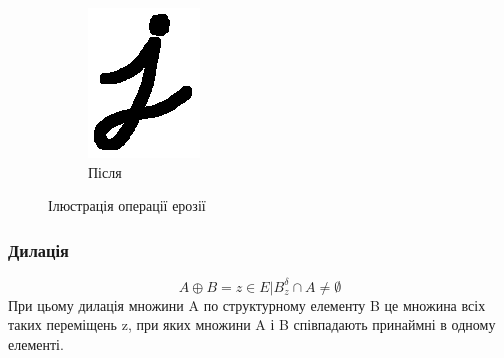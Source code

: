 \begin{figure}[H]
\begin{subfigure}[b]{0.2\textwidth}
			\includegraphics[width=\textwidth]{theory/img/erode_after}
			\caption{Після}
			\label{fig:erode_after}
		\end{subfigure}
		\caption{Ілюстрація операції ерозії}
	\end{figure}

	
\subsubsection{Дилація}
	\begin{equation}
	A \oplus B = { z \in E | B^{\delta}_{z} \cap A \neq \emptyset}
	\end{equation}
	При цьому дилація множини A по структурному елементу B це множина всіх таких переміщень z, при яких множини A і B співпадають принаймні в одному елементі.
	
